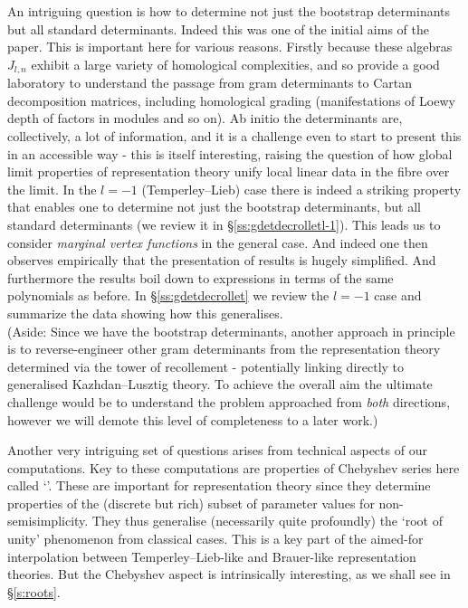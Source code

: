 An intriguing question is how to determine not just the bootstrap determinants but all standard determinants. 
Indeed this was one of the initial aims of the paper. 
This is important here 
for various reasons. Firstly 
because these algebras $J_{l,n}$ exhibit a large variety of homological complexities, and so 
provide a good laboratory to understand the passage from gram determinants to Cartan decomposition matrices, 
including homological grading (manifestations of Loewy depth of factors in modules and so on). 
Ab initio the determinants are, collectively, a lot of information, and it is a challenge even to start to present this in an accessible way - this is itself interesting, raising the question of how global limit properties of representation theory unify local linear data in the fibre over the limit.  
In the $l=-1$ (Temperley--Lieb) case there is indeed a striking property that enables one to determine 
not just the bootstrap determinants, but all standard determinants (we review it in \S\ref{ss:gdetdecrolletl-1}). 
This leads us to consider {\em marginal vertex functions} in the general case. 
And indeed one then observes empirically that the presentation of results is hugely simplified. 
And furthermore the results boil down to expressions in terms of the same polynomials as before. 
In \S\ref{ss:gdetdecrollet} we review the $l=-1$ case and summarize the data showing how this generalises. 
\\
(Aside: Since we have the bootstrap determinants, another approach in principle is to reverse-engineer other gram determinants from the representation theory determined via the tower of recollement - potentially linking directly to generalised Kazhdan--Lusztig theory. To achieve the overall aim the ultimate challenge would be to understand the problem approached from {\em both} directions, however we will demote this level of completeness to  a later work.)

\medskip 

Another very intriguing set of questions arises from technical aspects of our computations. 
Key to these computations are properties of Chebyshev series here called `\ramping'. 
These are important for representation theory since they determine properties of the (discrete but rich) subset of parameter values for non-semisimplicity. 
They thus generalise 
(necessarily quite profoundly)
the `root of unity' phenomenon from classical cases. This is a key part of the aimed-for interpolation between Temperley--Lieb-like and Brauer-like representation theories. But the Chebyshev aspect is intrinsically interesting, as we shall see in \S\ref{s:roots}. 

